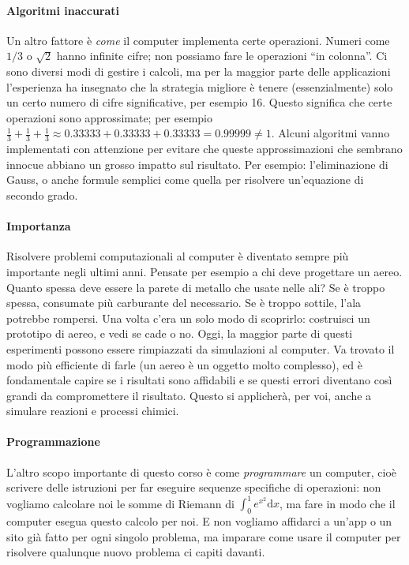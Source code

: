 \documentclass[a4paper]{report}
\theoremstyle{definiton}
\theoremstyle{remark}
\begin{document}
\paragraph{Algoritmi inaccurati} Un altro fattore è \emph{come} il computer implementa certe operazioni. Numeri come $1/3$ o $\sqrt{2}$ hanno infinite cifre; non possiamo fare le operazioni ``in colonna''. Ci sono diversi modi di gestire i calcoli, ma per la maggior parte delle applicazioni l'esperienza ha insegnato che la strategia migliore è tenere (essenzialmente) solo un certo numero di cifre significative, per esempio 16. Questo significa che certe operazioni sono approssimate; per esempio $\frac13 + \frac13 + \frac13 \approx 0.33333 + 0.33333 + 0.33333 = 0.99999 \neq 1$. Alcuni algoritmi vanno implementati con attenzione per evitare che queste approssimazioni che sembrano innocue abbiano un grosso impatto sul risultato. Per esempio: l'eliminazione di Gauss, o anche formule semplici come quella per risolvere un'equazione di secondo grado.

\paragraph{Importanza} Risolvere problemi computazionali al computer è diventato sempre più importante negli ultimi anni. Pensate per esempio a chi deve progettare un aereo. Quanto spessa deve essere la parete di metallo che usate nelle ali? Se è troppo spessa, consumate più carburante del necessario. Se è troppo sottile, l'ala potrebbe rompersi. Una volta c'era un solo modo di scoprirlo: costruisci un prototipo di aereo, e vedi se cade o no. Oggi, la maggior parte di questi esperimenti possono essere rimpiazzati da simulazioni al computer. Va trovato il modo più efficiente di farle (un aereo è un oggetto molto complesso), ed è fondamentale capire se i risultati sono affidabili e se questi errori diventano così grandi da compromettere il risultato. Questo si applicherà, per voi, anche a simulare reazioni e processi chimici.

\paragraph{Programmazione} L'altro scopo importante di questo corso è come \emph{programmare} un computer, cioè scrivere delle istruzioni per far eseguire sequenze specifiche di operazioni: non vogliamo calcolare noi le somme di Riemann di $\int_0^1 e^{x^2} \mathrm{d}x$, ma fare in modo che il computer esegua questo calcolo per noi. E non vogliamo affidarci a un'app o un sito già fatto per ogni singolo problema, ma imparare come usare il computer per risolvere qualunque nuovo problema ci capiti davanti.
\end{document}
